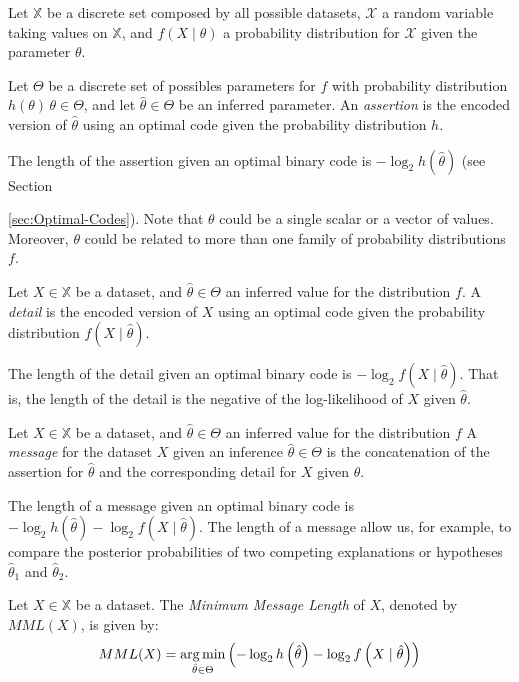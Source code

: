 Let $\mathbb{X}$ be a discrete set composed by all possible datasets, $\mathcal{X}$ a random variable taking values on $\mathbb{X}$, and $f(X \mid \theta)$ a probability distribution for $\mathcal{X}$ given the parameter $\theta$.

\begin{definition}
Let $\Theta$ be a discrete set of possibles parameters for $f$ with probability distribution $h(\theta) \, \theta \in \Theta$, and let $\hat\theta \in \Theta$ be an inferred parameter. An \emph{assertion} is the encoded version of $\hat\theta$ using an optimal code given the probability distribution $h$.
\end{definition}

The length of the assertion given an optimal binary code is $- \log_2 h(\hat\theta)$ (see Section {\ref{sec:Optimal-Codes}). Note that $\theta$ could be a single scalar or a vector of values. Moreover, $\theta$ could be related to more than one family of probability distributions $f$.

\begin{definition}
Let $X \in \mathbb{X}$ be a dataset, and $\hat \theta \in \Theta$ an inferred value for the distribution $f$. A \emph{detail} is the encoded version of $X$ using an optimal code given the probability distribution $f(X \mid \hat\theta)$.
\end{definition}

The length of the detail given an optimal binary code is $- \log_2 f( X \mid \hat\theta )$. That is, the length of the detail is the negative of the log-likelihood of $X$ given $\hat\theta$.

\begin{definition}
Let $X \in \mathbb{X}$ be a dataset, and $\hat \theta \in \Theta$ an inferred value for the distribution $f$ A \emph{message} for the dataset $X$ given an inference $\hat\theta \in \Theta$ is the concatenation of the assertion for $\hat\theta$ and the corresponding detail for $X$ given $\theta$.
\end{definition}

The length of a message given an optimal binary code is $- \log_2 h \left( \hat\theta \right) - \log_2 f \left( X \mid \hat\theta \right)$. The length of a message allow us, for example, to compare the posterior probabilities of two competing explanations or hypotheses $\hat\theta_1$ and $\hat\theta_2$.

\begin{definition}
Let $X \in \mathbb{X}$ be a dataset. The \emph{Minimum Message Length} of $X$, denoted by $MML(X)$, is given by:
\[
MML(X) = \operatorname*{arg\,min}_{\hat\theta \in \Theta} \left( - \log_2 h \left( \hat\theta \right) - \log_2 f \left( X \mid \hat\theta \right) \right)
\]


\end{definition}}
